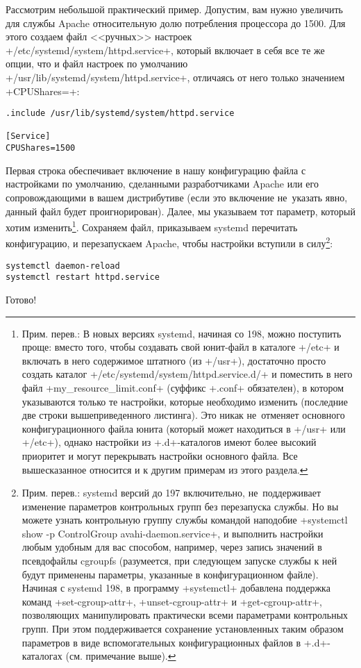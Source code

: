 \documentclass[10pt,oneside,a4paper]{article}
\begin{document}
Рассмотрим небольшой практический пример. Допустим, вам нужно увеличить
для службы Apache относительную долю потребления процессора до 1500. Для этого
создаем файл <<ручных>> настроек +/etc/systemd/system/httpd.service+, который
включает в себя все те же опции, что и файл настроек по умолчанию
+/usr/lib/systemd/system/httpd.service+, отличаясь от него только значением
+CPUShares=+:
\begin{Verbatim}
.include /usr/lib/systemd/system/httpd.service

[Service]
CPUShares=1500
\end{Verbatim}
Первая строка обеспечивает включение в нашу конфигурацию файла с настройками по
умолчанию, сделанными разработчиками Apache или его сопровождающими в вашем
дистрибутиве (если это включение не~указать явно, данный файл будет
проигнорирован).  Далее, мы указываем тот параметр, который хотим
изменить\footnote{Прим. перев.: В новых версиях systemd, начиная со 198, можно
поступить проще: вместо того, чтобы создавать свой юнит-файл в каталоге +/etc+ и
включать в него содержимое штатного (из +/usr+), достаточно просто создать
каталог +/etc/systemd/system/httpd.service.d/+ и поместить в него файл
+my_resource_limit.conf+ (суффикс +.conf+ обязателен), в котором указываются
только те настройки, которые необходимо изменить (последние две строки
вышеприведенного листинга). Это никак не~отменяет основного конфигурационного
файла юнита (который может находиться в +/usr+ или +/etc+), однако настройки из
+.d+-каталогов имеют более высокий приоритет и могут перекрывать настройки
основного файла. Все вышесказанное относится и к другим примерам из этого
раздела.}. Сохраняем файл, приказываем systemd перечитать конфигурацию, и
перезапускаем Apache, чтобы настройки вступили в силу\footnote{Прим. перев.:
systemd версий до 197 включительно, не~поддерживает изменение параметров
контрольных групп без перезапуска службы. Но вы можете узнать контрольную группу
службы командой наподобие +systemctl show -p ControlGroup avahi-daemon.service+,
и выполнить настройки любым удобным для вас способом, например, через запись
значений в псевдофайлы cgroupfs (разумеется, при следующем запуске службы к ней
будут применены параметры, указанные в конфигурационном файле). Начиная с
systemd 198, в программу +systemctl+ добавлена поддержка команд
+set-cgroup-attr+, +unset-cgroup-attr+ и +get-cgroup-attr+, позволяющих
манипулировать практически всеми параметрами контрольных групп. При этом
поддерживается сохранение установленных таким образом параметров в виде
вспомогательных конфигурационных файлов в +.d+-каталогах (см. примечание
выше).}:
\begin{Verbatim}
systemctl daemon-reload
systemctl restart httpd.service
\end{Verbatim}
Готово!
\end{document}
